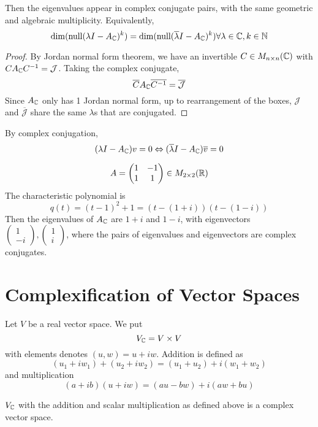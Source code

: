 \documentclass[12pt]{article}
\begin{document}
Then the eigenvalues appear in complex conjugate pairs, with the same geometric and algebraic multiplicity. Equivalently,
$$\dim(\text{null}(\lambda I - A_{\mathbb{C}})^k) = \dim(\text{null}(\overline{\lambda} I - A_{\mathbb{C}})^k) \forall \lambda \in \mathbb{C}, k \in \mathbb{N}$$

\begin{proof}
    By Jordan normal form theorem, we have an invertible $C \in M_{n \times n}(\mathbb{C})$ with $CA_{\mathbb{C}}C^{-1} = \mathcal J$. Taking the complex conjugate,
    $$\overline CA_{\mathbb{C}}\overline{C^{-1}} = \overline{\mathcal J}$$
    Since $A_{\mathbb{C}}$ only has 1 Jordan normal form, up to rearrangement of the boxes, $\mathcal J$ and $\overline{\mathcal J}$ share the same $\lambda$s that are conjugated.
\end{proof}

By complex conjugation,
$$(\lambda I - A_{\mathbb{C}})v = 0 \Leftrightarrow (\overline \lambda I - A_{\mathbb{C}})\overline v = 0$$

\begin{ex}
    $$A = \begin{pmatrix} 1 & -1 \\ 1 & 1 \end{pmatrix} \in M_{2 \times 2}(\mathbb{R})$$
    The characteristic polynomial is
    $$q(t) = (t-1)^2 + 1 = (t-(1+i))(t-(1-i))$$
    Then the eigenvalues of $A_{\mathbb{C}}$ are $1+i$ and $1-i$, with eigenvectors $\begin{pmatrix} 1 \\ -i \end{pmatrix}, \begin{pmatrix} 1 \\ i \end{pmatrix}$, where the pairs of eigenvalues and eigenvectors are complex conjugates.
\end{ex}

\section{Complexification of Vector Spaces}

Let $V$ be a real vector space. We put
$$V_{\mathbb{C}} = V \times V$$
with elements denotes $(u,w) = u+iw$. Addition is defined as
$$(u_1 + iw_1) + (u_2 + iw_2) = (u_1+u_2) + i(w_1+w_2)$$
and multiplication
$$(a+ib)(u+iw) = (au-bw) + i(aw+bu)$$

\begin{lem}
    $V_{\mathbb{C}}$ with the addition and scalar multiplication as defined above is a complex vector space.
\end{lem}
\end{document}
